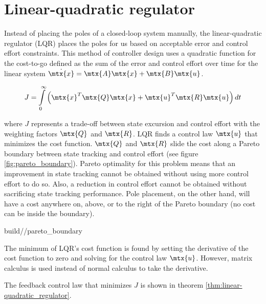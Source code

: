 \section{Linear-quadratic regulator} \label{sec:lqr}

Instead of placing the poles of a closed-loop \gls{system} manually, the
linear-quadratic regulator (LQR) places the poles for us based on acceptable
\gls{error} and \gls{control effort} constraints. This method of controller
design uses a quadratic function for the cost-to-go defined as the sum of the
\gls{error} and \gls{control effort} over time for the linear \gls{system}
$\dot{\mtx{x}} = \mtx{A}\mtx{x} + \mtx{B}\mtx{u}$.

\begin{equation*}
  J = \int\limits_0^\infty \left(\mtx{x}^T\mtx{Q}\mtx{x} +
    \mtx{u}^T\mtx{R}\mtx{u}\right) dt
\end{equation*}

where $J$ represents a trade-off between \gls{state} excursion and
\gls{control effort} with the weighting factors $\mtx{Q}$ and $\mtx{R}$. LQR
finds a \gls{control law} $\mtx{u}$ that minimizes the cost function. $\mtx{Q}$
and $\mtx{R}$ slide the cost along a Pareto boundary between state tracking and
\gls{control effort} (see figure \ref{fig:pareto_boundary}). Pareto optimality
for this problem means that an improvement in state \gls{tracking} cannot be
obtained without using more \gls{control effort} to do so. Also, a reduction in
\gls{control effort} cannot be obtained without sacrificing state \gls{tracking}
performance. Pole placement, on the other hand, will have a cost anywhere on,
above, or to the right of the Pareto boundary (no cost can be inside the
boundary).

\begin{svg}{build/\chapterpath/pareto_boundary}
  \caption{Pareto boundary for LQR}
  \label{fig:pareto_boundary}
\end{svg}

The minimum of LQR's cost function is found by setting the derivative of the
cost function to zero and solving for the \gls{control law} $\mtx{u}$. However,
matrix calculus is used instead of normal calculus to take the derivative.

The feedback \gls{control law} that minimizes $J$ is shown in theorem
\ref{thm:linear-quadratic_regulator}.

